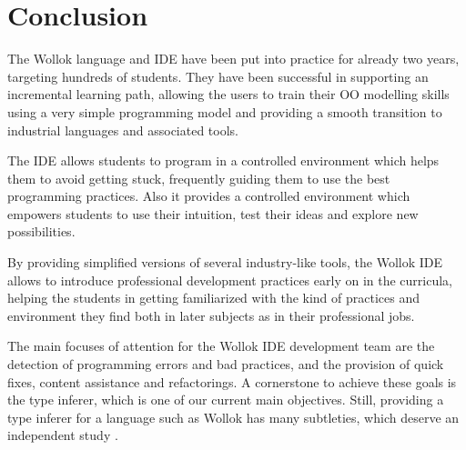 \section{Conclusion}
\label{sec:conclusion}


The Wollok language and IDE have been put into practice for already two years, targeting hundreds of students.
They have been successful in supporting an incremental learning path, 
allowing the users to train their OO modelling skills using a very simple programming model 
and providing a smooth transition to industrial languages and associated tools.


The IDE allows students to program in a controlled environment which helps them to avoid getting stuck, 
frequently guiding them to use the best programming practices.
Also it provides a controlled environment which empowers students to use their intuition, test their ideas and explore new possibilities.

By providing simplified versions of several industry-like tools, the Wollok IDE allows to introduce professional development practices early on in the curricula,
helping the students in getting familiarized with the kind of practices and environment they find both in later subjects as in their professional jobs.

\medskip
The main focuses of attention for the Wollok IDE development team are the detection of programming errors and bad practices, and the provision of quick fixes, content assistance and refactorings.
A cornerstone to achieve these goals is the type inferer, which is one of our current main objectives.
Still, providing a type inferer for a language such as Wollok has many subtleties, which deserve an independent study \cite{passerini_nicolas_extensible_2014}.

